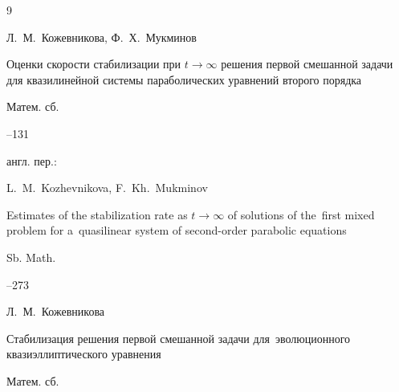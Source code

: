 \begin{thebibliography}{9}




\by Л.~М.~Кожевникова, Ф.~Х.~Мукминов

\paper Оценки скорости стабилизации при \mbox{$t\to\infty$} решения первой смешанной задачи для квазилинейной системы параболических уравнений второго порядка

\jour Матем. сб.




--131





\transl англ. пер.:~

\by L.~M.~Kozhevnikova, F.~Kh.~Mukminov

\paper Estimates of the stabilization rate as $t\to\infty$ of solutions of the~first mixed problem for a~quasilinear system of second-order parabolic equations

\jour Sb. Math.




--273








\by Л.~М.~Кожевникова

\paper Стабилизация решения первой смешанной задачи для~эволюционного квазиэллиптического уравнения

\jour Матем. сб.





\end{thebibliography}
